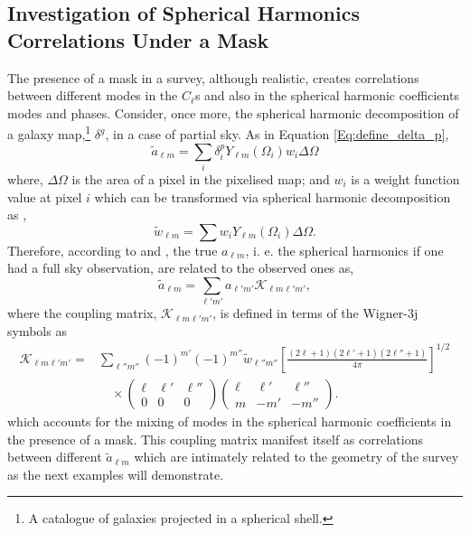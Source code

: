 \subsection{Investigation of Spherical Harmonics Correlations Under a Mask}\label{Sec:BPL:AlmsInvestigation}
The presence of a mask in a survey, although realistic, creates correlations between different modes in the $C_{\ell}$s and also in the spherical harmonic coefficients modes and phases. Consider, once more, the spherical harmonic decomposition of a galaxy map,\footnote{A catalogue of galaxies projected in a spherical shell.} $\delta^g$, in a case of partial sky. As in Equation \eqref{Eq:define_delta_p},
\begin{equation}
    \tilde{a}_{\ell m} = \sum_i \delta^p_i Y_{\ell m}(\Omega_i)w_i\Delta\Omega
\end{equation}
where, $\Delta\Omega$ is the area of a pixel in the pixelised map; and $w_i$ is a weight function value at pixel $i$ which can be transformed via spherical harmonic decomposition as \citep{Efstat2004},
\begin{equation}
    \tilde{w}_{\ell m} = \sum w_i Y_{\ell m}(\Omega_i)\Delta\Omega.
\end{equation}
Therefore, according to \cite{PolSpice2001} and \cite{Efstat2004}, the true $a_{\ell m}$, i. e. the spherical harmonics if one had a full sky observation, are related to the observed ones as,
\begin{equation}
    \tilde{a}_{\ell m} = \sum_{\ell' m'} a_{\ell' m'}\mathcal{K}_{\ell m \ell' m'}, 
\end{equation}
where the coupling matrix, $\mathcal{K}_{\ell m \ell' m'}$, is defined in terms of the Wigner-3j symbols as
\begin{align}
\label{Eq:Klmlm}
    \mathcal{K}_{\ell m \ell' m'} = & \sum_{\ell'' m''} (-1)^{m'}(-1)^{m''} \tilde{w}_{\ell'' m''} \left[\frac{(2\ell + 1)(2\ell'+1)(2\ell''+1)}{4\pi} \right]^{1/2} \nonumber \\
    & \quad \times \begin{pmatrix} \ell & \ell' & \ell'' \\ 0 & 0 & 0 \end{pmatrix}\begin{pmatrix} \ell & \ell' & \ell'' \\ m & -m' & -m'' \end{pmatrix}.
\end{align}
which accounts for the mixing of modes in the spherical harmonic coefficients in the presence of a mask. This coupling matrix manifest itself as correlations between different $\tilde{a}_{\ell m}$ which are intimately related to the geometry of the survey as the next examples will demonstrate.

